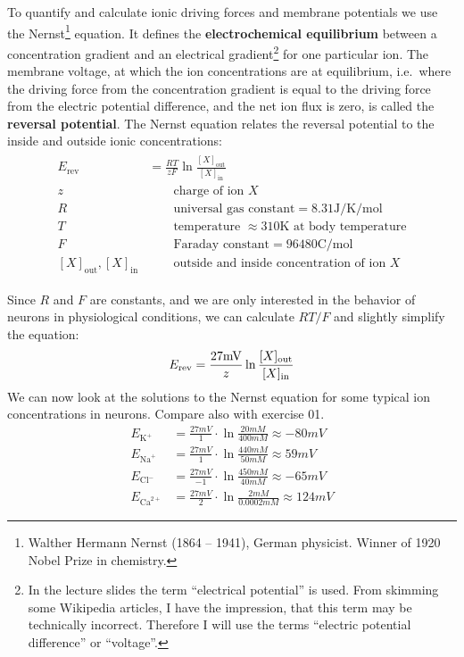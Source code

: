 To quantify and calculate ionic driving forces and membrane potentials we use the Nernst\footnote{Walther Hermann Nernst (1864 -- 1941), German physicist. Winner of 1920 Nobel Prize in chemistry.} equation. It defines the \textbf{electrochemical equilibrium} between a concentration gradient and an electrical gradient\footnote{In the lecture slides the term ``electrical potential'' is used. From skimming some Wikipedia articles, I have the impression, that this term may be technically incorrect. Therefore I will use the terms ``electric potential difference'' or ``voltage''.} for one particular ion. The membrane voltage, at which the ion concentrations are at equilibrium, i.e.\ where the driving force from the concentration gradient is equal to the driving force from the electric potential difference, and the net ion flux is zero, is called the \textbf{reversal potential}. The Nernst equation relates the reversal potential to the inside and outside ionic concentrations:
\begin{align}
\begin{split}
E_\mathrm{rev} &= \frac{RT}{zF} \ln \frac{[X]_\mathrm{out}}{[X]_\mathrm{in}} \\
z &\qquad \text{charge of ion $X$} \\
R &\qquad \text{universal gas constant}=8.31 \si{\joule\per\kelvin\per\mole} \\
T &\qquad \text{temperature $\approx 310\si{\kelvin}$ at body temperature} \\
F &\qquad \text{Faraday constant}=96480\si{\coulomb\per\mole} \\
[X]_\mathrm{out}, [X]_\mathrm{in} &\qquad \text{outside and inside concentration of ion $X$}
\end{split}
\label{faraday}
\end{align}

Since $R$ and $F$ are constants, and we are only interested in the behavior of neurons in physiological conditions, we can calculate $RT/F$ and slightly simplify the equation:
\begin{equation}
E_\mathrm{rev} = \frac{27\si{\milli\volt}}{z} \ln \frac{[X]_\mathrm{out}}{[X]_\mathrm{in}} \\
\label{nernst}
\end{equation}
We can now look at the solutions to the Nernst equation for some typical ion concentrations in neurons. Compare also with exercise 01. 
\begin{align*}
E_{\text{K}^+}&=\frac{27 \si{mV}}{1} \cdot \ln \frac{20 \si{mM}}{400 \si{mM}} \approx -80 \si{mV}\\
E_{\text{Na}^+}&=\frac{27 \si{mV}}{1} \cdot \ln \frac{440 \si{mM}}{50 \si{mM}} \approx 59 \si{mV}\\
E_{\text{Cl}^-}&=\frac{27 \si{mV}}{-1} \cdot \ln \frac{450 \si{mM}}{40 \si{mM}} \approx -65 \si{mV}\\
E_{\text{Ca}^{2+}}&=\frac{27 \si{mV}}{2} \cdot \ln \frac{2 \si{mM}}{0.0002\si{mM}} \approx 124 \si{mV}
\end{align*}

